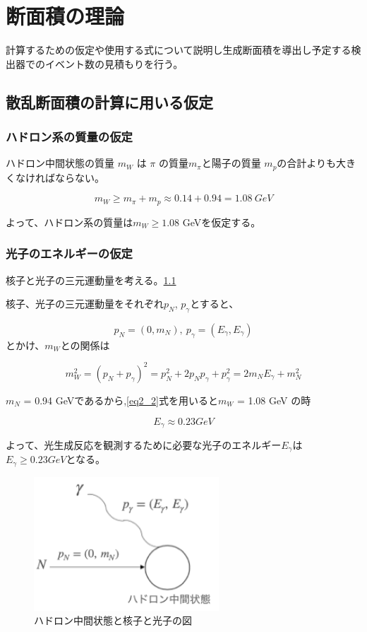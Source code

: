\chapter{断面積の理論} \label{cha:cross_section}
計算するための仮定や使用する式について説明し生成断面積を導出し予定する検出器でのイベント数の見積もりを行う。

\section{散乱断面積の計算に用いる仮定}
\subsection{ハドロン系の質量の仮定}
ハドロン中間状態の質量 $m_W$ は $\pi$ の質量$m_\pi$と陽子の質量 $m_p$の合計よりも大きくなければならない。

\begin{equation}
    m_W \geq m_\pi + m_p \approx 0.14 + 0.94 = 1.08 \ GeV
\end{equation}

よって、ハドロン系の質量は$m_W \geq 1.08$ GeVを仮定する。


\subsection{光子のエネルギーの仮定}
核子と光子の三元運動量を考える。\ref{fig:sigma1}

核子、光子の三元運動量をそれぞれ$p_N$, $p_\gamma$とすると、

\begin{equation}
    p_N = (0, m_N),\  p_\gamma = (E_\gamma, E_\gamma)
\end{equation}
とかけ、$m_W$との関係は

\begin{equation}
    \label{eq2_2}
    m_W^2 = (p_N + p_\gamma)^2 = p_N^2 + 2p_N p_\gamma + p_\gamma^2
    = 2m_N E_\gamma + m_N^2
\end{equation}

$m_N$ = 0.94 GeVであるから,\ref{eq2_2}式を用いると$m_W$ = 1.08 GeV の時


\begin{equation}
    E_\gamma \approx 0.23 GeV
\end{equation}

よって、光生成反応を観測するために必要な光子のエネルギー$E_\gamma$は
$E_\gamma \geq 0.23 GeV$となる。

\begin{figure}[H]
    \centering
    \includegraphics[height=5cm]{img/diagram_momentum.png}
    \caption{ハドロン中間状態と核子と光子の図}
    \label{fig:sigma1}
\end{figure}

